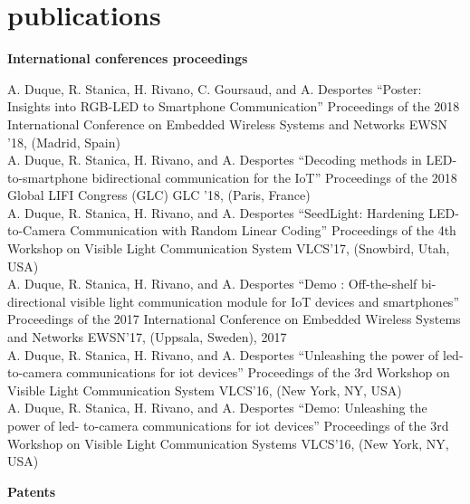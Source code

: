 \documentclass[]{cv-style}          %
\begin{document}
\section{publications}
 \vspace{-0.2cm}
\large{\textbf{International conferences proceedings}}

\normalsize
\begin{publist}
\pub
{A. Duque, R. Stanica, H. Rivano, C. Goursaud, and A. Desportes}
{“Poster: Insights into RGB-LED to Smartphone Communication”}
{Proceedings of the 2018 International Conference on Embedded Wireless Systems and Networks}
{EWSN ’18, (Madrid, Spain)}\\
\pub
{A. Duque, R. Stanica, H. Rivano, and A. Desportes}
{“Decoding methods in LED-to-smartphone bidirectional communication for the IoT”}
{Proceedings of the 2018 Global LIFI Congress (GLC)}
{GLC ’18, (Paris, France)}\\
\pub
{A. Duque, R. Stanica, H. Rivano, and A. Desportes}
{“SeedLight: Hardening LED-to-Camera Communication with Random Linear Coding”}
{Proceedings of the 4th Workshop on Visible Light Communication System}
{VLCS’17, (Snowbird, Utah, USA)}\\
\pub
{A. Duque, R. Stanica, H. Rivano, and A. Desportes}
{“Demo : Off-the-shelf bi-directional visible light communication module for IoT devices and smartphones”}
{Proceedings of the 2017 International Conference on Embedded Wireless Systems and Networks}
{EWSN’17, (Uppsala, Sweden), 2017}\\
\pub
  {A. Duque, R. Stanica, H. Rivano, and A. Desportes}
  {“Unleashing the power of led- to-camera communications for iot devices”}
  {Proceedings of the 3rd Workshop on Visible Light Communication System}
  {VLCS’16, (New York, NY, USA)}\\
\pub
  {A. Duque, R. Stanica, H. Rivano, and A. Desportes} {“Demo: Unleashing the power of led- to-camera communications for iot devices”} {Proceedings of the 3rd Workshop on Visible Light Communication Systems} {VLCS’16, (New York, NY, USA)}

\end{publist}


\large{\textbf{Patents}}
\end{document}
